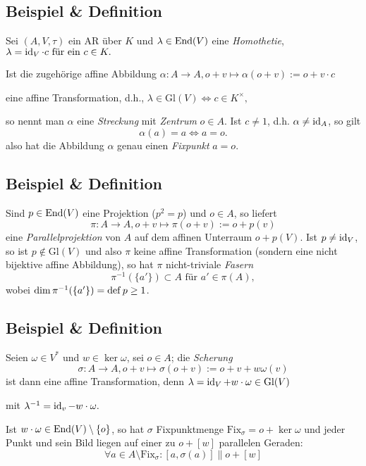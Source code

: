  \subsection{Beispiel \& Definition}
 	\begin{Definition}[Streckung]
 		Sei $ (A,V,\tau) $ ein AR über $ K $ und $ \lambda\in\operatorname{End}(V) $ eine \emph{Homothetie},\hfill
 		$ \lambda= \operatorname{id}_V\cdot c \text{ für ein }c\in K. $

 		Ist die zugehörige affine Abbildung\hfill
 		$ \alpha:A\to A,o+v\mapsto \alpha(o+v):= o+v\cdot c $

 		eine affine Transformation, d.h.,\hfill
 		$ \lambda \in \mathrm{Gl}(V)\Leftrightarrow c\in K^\times, $

 		so nennt man $ \alpha $ eine \emph{Streckung} mit \emph{Zentrum} $ o\in A $. Ist $ c\neq 1 $, d.h. $ \alpha \neq \operatorname{id}_A $, so gilt
 		\[
 			\alpha(a) = a\Leftrightarrow a = o.
 		\]
 		also hat die Abbildung $ \alpha $ genau einen \emph{Fixpunkt} $ a = o $.
 	\end{Definition}
 \subsection{Beispiel \& Definition}
 	\begin{Definition}[Parallelprojektion]
 		Sind $ p\in \operatorname{End}(V) $ eine Projektion ($ p^2 = p $) und $ o\in A $, so liefert
 		\[
 			\pi:A\to A,o+v\mapsto \pi(o+v):= o+p(v)
 		\]
 		eine \emph{Parallelprojektion} von $ A $ auf dem affinen Unterraum $ o+p(V) $. Ist $ p\neq \operatorname{id}_V $, so ist $ p\notin \mathrm{Gl}(V) $ und also $ \pi $ keine affine Transformation (sondern eine nicht bijektive affine Abbildung), so hat $ \pi $ nicht-triviale \emph{Fasern}
 		\[
 			\pi^{-1}(\{a'\})\subset A \text{ für } a'\in \pi(A),
 		\]
 		wobei $ \dim\pi^{-1}(\{a'\}) = \operatorname{def} p \geq 1 $.
 	\end{Definition}
 \subsection{Beispiel \& Definition}
 	\begin{Definition}[Scherung]
 		Seien $ \omega\in V^* $ und $ w\in \ker \omega $, sei $ o\in A $; die \emph{Scherung}
 		\[
 			\sigma:A\to A, o+v\mapsto \sigma(o+v):= o+v+w\omega(v)
 		\]
 		ist dann eine affine Transformation, denn\hfill
 		$ \lambda = \operatorname{id}_V + w\cdot \omega \in \mathrm{Gl}(V) $

 		mit\hfill
 		$ \lambda^{-1} = \operatorname{id}_v - w\cdot \omega. $

 		Ist $ w\cdot\omega\in\operatorname{End}(V)\setminus\{o\} $, so hat $ \sigma $ Fixpunktmenge $ \text{Fix}_\sigma = o+\ker\omega $ und jeder Punkt und sein Bild liegen auf einer zu $ o+[w] $ parallelen Geraden:
 		\[
 			\forall a\in A\setminus \text{Fix}_\sigma : [a,\sigma(a)] \parallel o+[w]
 		\]
 	\end{Definition}

